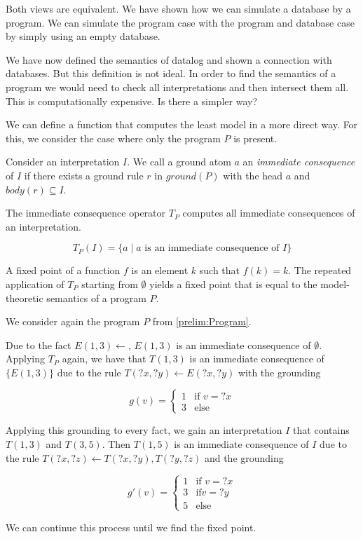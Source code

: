 Both views are equivalent. We have shown how we can simulate a database by a program. We can simulate the program case with the program and database case by simply using an empty database.

We have now defined the semantics of datalog and shown a connection with databases. But this definition is not ideal. In order to find the semantics of a program we would need to check all interpretations and then intersect them all. This is computationally expensive. Is there a simpler way?

We can define a function that computes the least model in a more direct way. For this, we consider the case where only the program $P$ is present.

Consider an interpretation $I$. We call a ground atom $a$ an \textit{immediate consequence} of $I$ if there exists a ground rule $r$ in $ground(P)$ with the head $a$ and $body(r) \subseteq I$.

The immediate consequence operator $T_P$ computes all immediate consequences of an interpretation. 

\[T_P(I) = \{ a \mid \text {$a$ is an immediate consequence of $I$}\} \]

A fixed point of a function $f$ is an element $k$ such that $f(k) = k$. The repeated application of $T_P$ starting from $\emptyset$ yields a fixed point that is equal to the model-theoretic semantics of a program $P$. 

\begin{example}
    We consider again the program $P$ from \cref{prelim:Program}. 

    Due to the fact $E(1,3) \leftarrow$, $E(1,3)$ is an immediate consequence of $\emptyset$. Applying $T_P$ again, we have that $T(1,3)$ is an immediate consequence of $\{E(1,3)\}$ due to the rule $T(?x,?y) \leftarrow E(?x, ?y)$ with the grounding 
    
    \[
    g(v) =
    \begin{cases}
        1 & \text{if } v = ?x \\
        3 & \text{else}
    \end{cases}
    \]

    Applying this grounding to every fact, we gain an interpretation $I$ that contains $T(1,3)$ and $T(3,5)$. Then $T(1,5)$ is an immediate consequence of $I$ due to the rule $T(?x, ?z) \leftarrow T(?x,?y), T(?y, ?z)$ and the grounding 

    \[
    g'(v) =
    \begin{cases}
        1 & \text{if } v = ?x \\
        3 & \text{if} v = ?y \\
        5 & \text{else}
    \end{cases}
    \]

    We can continue this process until we find the fixed point.
\end{example}

